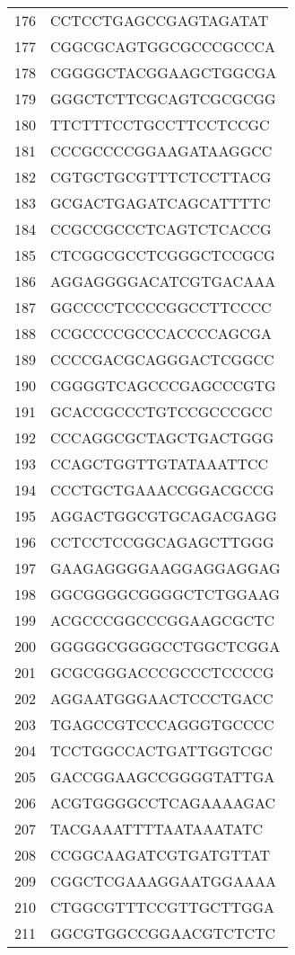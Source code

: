 \documentclass[letterpaper,12pt]{article}
\numberwithin{equation}{appendix}
\begin{document}
{{\begin{table}[ht]
\begin{tabular}{rl}
  176 & CCTCCTGAGCCGAGTAGATAT \\ 
  177 & CGGCGCAGTGGCGCCCGCCCA \\ 
  178 & CGGGGCTACGGAAGCTGGCGA \\ 
  179 & GGGCTCTTCGCAGTCGCGCGG \\ 
  180 & TTCTTTCCTGCCTTCCTCCGC \\ 
  181 & CCCGCCCCGGAAGATAAGGCC \\ 
  182 & CGTGCTGCGTTTCTCCTTACG \\ 
  183 & GCGACTGAGATCAGCATTTTC \\ 
  184 & CCGCCGCCCTCAGTCTCACCG \\ 
  185 & CTCGGCGCCTCGGGCTCCGCG \\ 
  186 & AGGAGGGGACATCGTGACAAA \\ 
  187 & GGCCCCTCCCCGGCCTTCCCC \\ 
  188 & CCGCCCCGCCCACCCCAGCGA \\ 
  189 & CCCCGACGCAGGGACTCGGCC \\ 
  190 & CGGGGTCAGCCCGAGCCCGTG \\ 
  191 & GCACCGCCCTGTCCGCCCGCC \\ 
  192 & CCCAGGCGCTAGCTGACTGGG \\ 
  193 & CCAGCTGGTTGTATAAATTCC \\ 
  194 & CCCTGCTGAAACCGGACGCCG \\ 
  195 & AGGACTGGCGTGCAGACGAGG \\ 
  196 & CCTCCTCCGGCAGAGCTTGGG \\ 
  197 & GAAGAGGGGAAGGAGGAGGAG \\ 
  198 & GGCGGGGCGGGGCTCTGGAAG \\ 
  199 & ACGCCCGGCCCGGAAGCGCTC \\ 
  200 & GGGGGCGGGGCCTGGCTCGGA \\ 
  201 & GCGCGGGACCCGCCCTCCCCG \\ 
  202 & AGGAATGGGAACTCCCTGACC \\ 
  203 & TGAGCCGTCCCAGGGTGCCCC \\ 
  204 & TCCTGGCCACTGATTGGTCGC \\ 
  205 & GACCGGAAGCCGGGGTATTGA \\ 
  206 & ACGTGGGGCCTCAGAAAAGAC \\ 
  207 & TACGAAATTTTAATAAATATC \\ 
  208 & CCGGCAAGATCGTGATGTTAT \\ 
  209 & CGGCTCGAAAGGAATGGAAAA \\ 
  210 & CTGGCGTTTCCGTTGCTTGGA \\ 
  211 & GGCGTGGCCGGAACGTCTCTC \\ 

\end{tabular}
\end{table}}}
\end{document}
